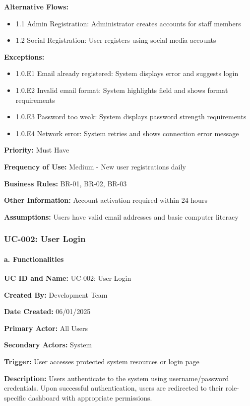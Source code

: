 \documentclass[12pt,a4paper]{article}
\begin{document}
\textbf{Alternative Flows:}
\begin{itemize}
\item 1.1 Admin Registration: Administrator creates accounts for staff members
\item 1.2 Social Registration: User registers using social media accounts
\end{itemize}

\textbf{Exceptions:}
\begin{itemize}
\item 1.0.E1 Email already registered: System displays error and suggests login
\item 1.0.E2 Invalid email format: System highlights field and shows format requirements
\item 1.0.E3 Password too weak: System displays password strength requirements
\item 1.0.E4 Network error: System retries and shows connection error message
\end{itemize}

\textbf{Priority:} Must Have

\textbf{Frequency of Use:} Medium - New user registrations daily

\textbf{Business Rules:} BR-01, BR-02, BR-03

\textbf{Other Information:} Account activation required within 24 hours

\textbf{Assumptions:} Users have valid email addresses and basic computer literacy

\subsubsection{UC-002: User Login}

\paragraph{a. Functionalities}

\textbf{UC ID and Name:} UC-002: User Login

\textbf{Created By:} Development Team

\textbf{Date Created:} 06/01/2025

\textbf{Primary Actor:} All Users

\textbf{Secondary Actors:} System

\textbf{Trigger:} User accesses protected system resources or login page

\textbf{Description:} Users authenticate to the system using username/password credentials. Upon successful authentication, users are redirected to their role-specific dashboard with appropriate permissions.
\end{document}
